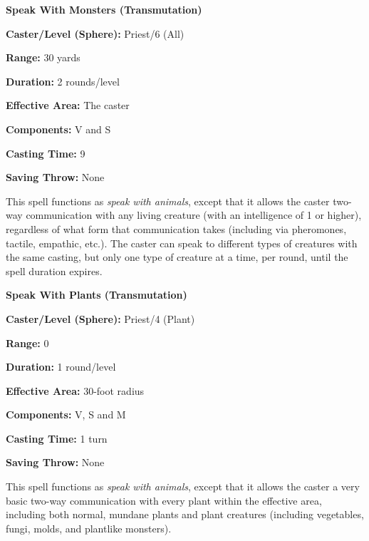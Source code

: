\begin{multicols}{2}
\begin{minipage}{\columnwidth}
\noindent \textbf{Speak With Monsters (Transmutation)}

\noindent \textbf{Caster/Level (Sphere):} Priest/6 (All)

\noindent \textbf{Range:} 30 yards

\noindent \textbf{Duration:} 2 rounds/level

\noindent \textbf{Effective Area:} The caster

\noindent \textbf{Components:} V and S

\noindent \textbf{Casting Time:} 9

\noindent \textbf{Saving Throw:} None

\end{minipage}

This spell functions as \textit{speak with animals}, except that it allows the caster two-way communication with any living creature (with an intelligence of 1 or higher), regardless of what form that communication takes (including via pheromones, tactile, empathic, etc.).  The caster can speak to different types of creatures with the same casting, but only one type of creature at a time, per round, until the spell duration expires.  

\vspace{1em}

\noindent
\begin{minipage}{\columnwidth}

\noindent \textbf{Speak With Plants (Transmutation)}

\noindent \textbf{Caster/Level (Sphere):} Priest/4 (Plant)

\noindent \textbf{Range:} 0

\noindent \textbf{Duration:} 1 round/level

\noindent \textbf{Effective Area:} 30-foot radius

\noindent \textbf{Components:} V, S and M

\noindent \textbf{Casting Time:} 1 turn

\noindent \textbf{Saving Throw:} None

\end{minipage}

This spell functions as \textit{speak with animals}, except that it allows the caster a very basic two-way communication with every plant within the effective area, including both normal, mundane plants and plant creatures (including vegetables, fungi, molds, and plantlike monsters).  


\end{multicols}
